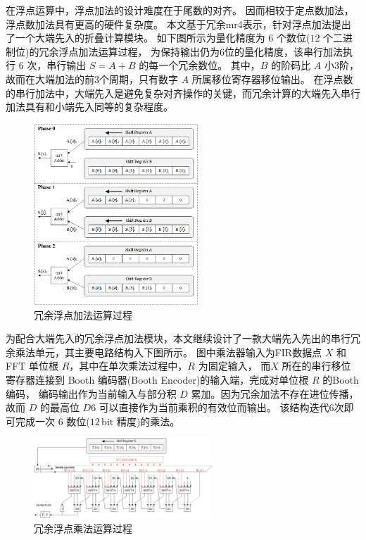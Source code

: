 在浮点运算中，浮点加法的设计难度在于尾数的对齐。
因而相较于定点数加法，浮点数加法具有更高的硬件复杂度。
本文基于冗余mr4表示，针对浮点加法提出了一个大端先入的折叠计算模块。
如下图所示为量化精度为 $6$ 个数位($12$ 个二进制位)的冗余浮点加法运算过程，
为保持输出仍为6位的量化精度，该串行加法执行 $6$ 次，串行输出 $S=A+B$ 的每一个冗余数位。
其中，$B$ 的阶码比 $A$ 小3阶，故而在大端加法的前3个周期，只有数字 $A$ 所属移位寄存器移位输出。
在浮点数的串行加法中，大端先入是避免复杂对齐操作的关键，而冗余计算的大端先入串行加法具有和小端先入同等的复杂程度。
\begin{center}
    \begin{figure}[hb!]
        \centering
        \includegraphics[width=0.55\textwidth]{figures/Float_Redundant_Adder.png}
        \caption{冗余浮点加法运算过程}
        \label{fig:Float-Redundant-Adder}
    \end{figure}
\end{center}

为配合大端先入的冗余浮点加法模块，本文继续设计了一款大端先入先出的串行冗余乘法单元，其主要电路结构入下图所示。
图中乘法器输入为FIR数据点 $X$ 和 FFT 单位根 $R$，其中在单次乘法过程中，$R$ 为固定输入，
而$X$ 所在的串行移位寄存器连接到 Booth 编码器(Booth Encoder)的输入端，完成对单位根 $R$ 的Booth编码，
编码输出作为当前输入与部分积 $D$ 累加。因为冗余加法不存在进位传播，故而 $D$ 的最高位 $D6$ 可以直接作为当前乘积的有效位而输出。
该结构迭代6次即可完成一次 $6$ 数位($12 \, \mathrm{bit}$ 精度)的乘法。
\begin{center}
    \begin{figure}[ht!]
        \centering
        \includegraphics[width=0.6\textwidth]{figures/Redundant_Multiplier.png}
        \caption{冗余浮点乘法运算过程}
        \label{fig:Redundant-Multiplier}
    \end{figure}
\end{center}

